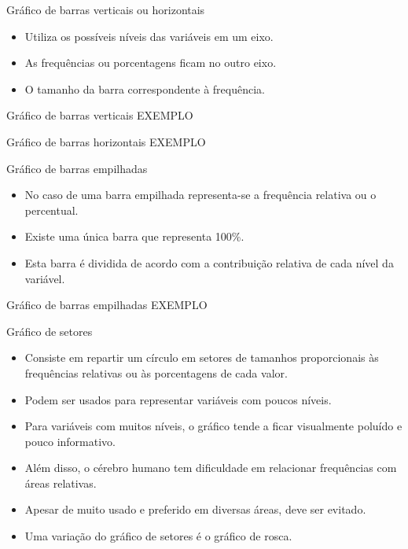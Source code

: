 \documentclass[
  ignorenonframetext,
  serif,
  professionalfont,
  usenames,
  dvipsnames,
  aspectratio = 169]{beamer}
\providecommand{\tightlist}{%
  \setlength{\itemsep}{0pt}\setlength{\parskip}{0pt}}
\renewcommand{\tightlist}{%
  \setlength{\itemsep}{0\baselineskip}
  \setlength{\parskip}{0.25\baselineskip}
}
\begin{document}
\begin{frame}{Gráfico de barras verticais ou horizontais}
\protect\hypertarget{gruxe1fico-de-barras-verticais-ou-horizontais}{}
\begin{itemize}
\tightlist
\item
  Utiliza os possíveis níveis das variáveis em um eixo.
\item
  As frequências ou porcentagens ficam no outro eixo.
\item
  O tamanho da barra correspondente à frequência.
\end{itemize}
\end{frame}

\begin{frame}{Gráfico de barras verticais}
\protect\hypertarget{gruxe1fico-de-barras-verticais}{}
EXEMPLO
\end{frame}

\begin{frame}{Gráfico de barras horizontais}
\protect\hypertarget{gruxe1fico-de-barras-horizontais}{}
EXEMPLO
\end{frame}

\begin{frame}{Gráfico de barras empilhadas}
\protect\hypertarget{gruxe1fico-de-barras-empilhadas}{}
\begin{itemize}
\tightlist
\item
  No caso de uma barra empilhada representa-se a frequência relativa ou
  o percentual.
\item
  Existe uma única barra que representa 100\%.
\item
  Esta barra é dividida de acordo com a contribuição relativa de cada
  nível da variável.
\end{itemize}
\end{frame}

\begin{frame}{Gráfico de barras empilhadas}
\protect\hypertarget{gruxe1fico-de-barras-empilhadas-1}{}
EXEMPLO
\end{frame}

\begin{frame}{Gráfico de setores}
\protect\hypertarget{gruxe1fico-de-setores}{}
\begin{itemize}
\tightlist
\item
  Consiste em repartir um círculo em setores de tamanhos proporcionais
  às frequências relativas ou às porcentagens de cada valor.
\item
  Podem ser usados para representar variáveis com poucos níveis.
\item
  Para variáveis com muitos níveis, o gráfico tende a ficar visualmente
  poluído e pouco informativo.
\item
  Além disso, o cérebro humano tem dificuldade em relacionar frequências
  com áreas relativas.
\item
  Apesar de muito usado e preferido em diversas áreas, deve ser evitado.
\item
  Uma variação do gráfico de setores é o gráfico de rosca.
\end{itemize}
\end{frame}
\end{document}
